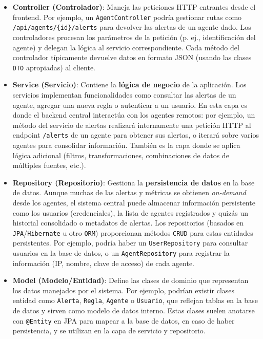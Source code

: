 \documentclass[11pt,a4paper,twoside]{report}
\begin{document}
\begin{itemize}
	\item \textbf{Controller (Controlador)}: Maneja las peticiones HTTP entrantes desde el frontend. Por ejemplo, un \texttt{AgentController} podría gestionar rutas como \texttt{/api/agents/\{id\}/alerts} para devolver las alertas de un agente dado. Los controladores procesan los parámetros de la petición (p. ej., identificación del agente) y delegan la lógica al servicio correspondiente. Cada método del controlador típicamente devuelve datos en formato JSON (usando las clases \texttt{DTO} apropiadas) al cliente.
	
	\item \textbf{Service (Servicio)}: Contiene la \textbf{lógica de negocio} de la aplicación. Los servicios implementan funcionalidades como consultar las alertas de un agente, agregar una nueva regla o autenticar a un usuario. En esta capa es donde el backend central interactúa con los agentes remotos: por ejemplo, un método del servicio de alertas realizará internamente una petición HTTP al endpoint \texttt{/alerts} de un agente para obtener sus alertas, o iterará sobre varios agentes para consolidar información. También es la capa donde se aplica lógica adicional (filtros, transformaciones, combinaciones de datos de múltiples fuentes, etc.).
	
	\item \textbf{Repository (Repositorio)}: Gestiona la \textbf{persistencia de datos} en la base de datos. Aunque muchas de las alertas y métricas se obtienen \textit{on-demand} desde los agentes, el sistema central puede almacenar información persistente como los usuarios (credenciales), la lista de agentes registrados y quizás un historial consolidado o metadatos de alertas. Los repositorios (basados en \texttt{JPA}/\texttt{Hibernate} u otro \texttt{ORM}) proporcionan métodos \texttt{CRUD} para estas entidades persistentes. Por ejemplo, podría haber un \texttt{UserRepository} para consultar usuarios en la base de datos, o un \texttt{AgentRepository} para registrar la información (IP, nombre, clave de acceso) de cada agente.
	
	\item \textbf{Model (Modelo/Entidad)}: Define las clases de dominio que representan los datos manejados por el sistema. Por ejemplo, podrían existir clases entidad como \texttt{Alerta}, \texttt{Regla}, \texttt{Agente} o \texttt{Usuario}, que reflejan tablas en la base de datos y sirven como modelo de datos interno. Estas clases suelen anotarse con \texttt{@Entity} en JPA para mapear a la base de datos, en caso de haber persistencia, y se utilizan en la capa de servicio y repositorio.
	

\end{itemize}
\end{document}
